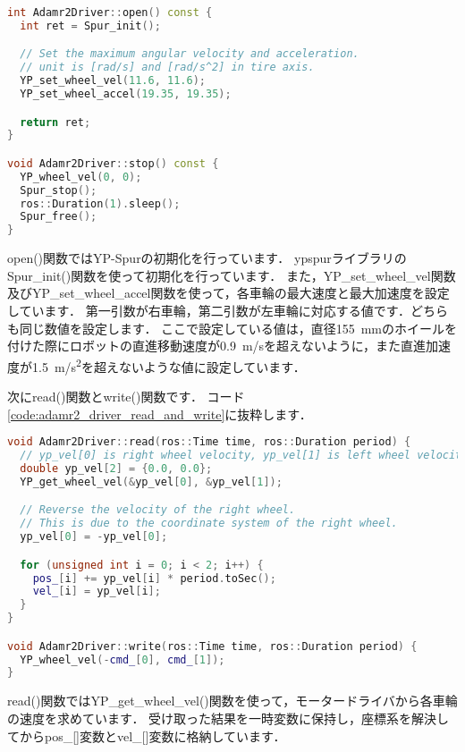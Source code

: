 \documentclass[{../../master}]{subfiles}
\begin{document}
\begin{lstlisting}[language=C++, label=code:adamr2_driver_open_and_stop, caption=\textsf{open()} and \textsf{stop()} Member Function in \textsf{adamr2\_driver.cpp}]
int Adamr2Driver::open() const {
  int ret = Spur_init();

  // Set the maximum angular velocity and acceleration.
  // unit is [rad/s] and [rad/s^2] in tire axis.
  YP_set_wheel_vel(11.6, 11.6);
  YP_set_wheel_accel(19.35, 19.35);

  return ret;
}

void Adamr2Driver::stop() const {
  YP_wheel_vel(0, 0);
  Spur_stop();
  ros::Duration(1).sleep();
  Spur_free();
}
\end{lstlisting}

\textsf{open()}関数ではYP-Spurの初期化を行っています．
\textsf{ypspur}ライブラリの\textsf{Spur\_init()}関数を使って初期化を行っています．
また，\textsf{YP\_set\_wheel\_vel}関数及び\textsf{YP\_set\_wheel\_accel}関数を使って，各車輪の最大速度と最大加速度を設定しています．
第一引数が右車輪，第二引数が左車輪に対応する値です．どちらも同じ数値を設定します．
ここで設定している値は，直径\SI{155}{mm}のホイールを付けた際にロボットの直進移動速度が\SI{0.9}{m/s}を超えないように，また直進加速度が\SI{1.5}{m/s^2}を超えないような値に設定しています．

次に\textsf{read()}関数と\textsf{write()}関数です．
コード\ref{code:adamr2_driver_read_and_write}に抜粋します．

\begin{lstlisting}[language=C++, label=code:adamr2_driver_read_and_write, caption=\textsf{read()} and \textsf{write()} Member Function in \textsf{adamr2\_driver.cpp}]
void Adamr2Driver::read(ros::Time time, ros::Duration period) {
  // yp_vel[0] is right wheel velocity, yp_vel[1] is left wheel velocity.
  double yp_vel[2] = {0.0, 0.0};
  YP_get_wheel_vel(&yp_vel[0], &yp_vel[1]);

  // Reverse the velocity of the right wheel.
  // This is due to the coordinate system of the right wheel.
  yp_vel[0] = -yp_vel[0];

  for (unsigned int i = 0; i < 2; i++) {
    pos_[i] += yp_vel[i] * period.toSec();
    vel_[i] = yp_vel[i];
  }
}

void Adamr2Driver::write(ros::Time time, ros::Duration period) {
  YP_wheel_vel(-cmd_[0], cmd_[1]);
}
\end{lstlisting}

\textsf{read()}関数では\textsf{YP\_get\_wheel\_vel()}関数を使って，モータードライバから各車輪の速度を求めています．
受け取った結果を一時変数に保持し，座標系を解決してから\textsf{pos\_[]}変数と\textsf{vel\_[]}変数に格納しています．
\end{document}
